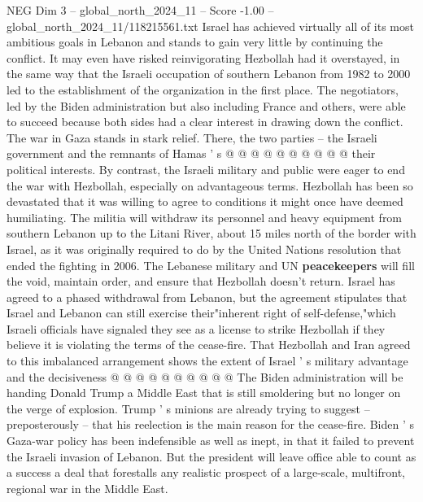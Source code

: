 \begin{textsample}{NEG Dim 3 – global\_north\_2024\_11 – Score -1.00 – global\_north\_2024\_11/118215561.txt}
Israel has achieved virtually all of its most ambitious goals in Lebanon and stands to gain very little by continuing the conflict.
It may even have risked reinvigorating Hezbollah had it overstayed, in the same way that the Israeli occupation of southern Lebanon from 1982 to 2000 led to the establishment of the organization in the first place.
The negotiators, led by the Biden administration but also including France and others, were able to succeed because both sides had a clear interest in drawing down the conflict.
The war in Gaza stands in stark relief.
There, the two parties -- the Israeli government and the remnants of Hamas ' s @ @ @ @ @ @ @ @ @ @ their political interests.
By contrast, the Israeli military and public were eager to end the war with Hezbollah, especially on advantageous terms.
Hezbollah has been so devastated that it was willing to agree to conditions it might once have deemed humiliating.
The militia will withdraw its personnel and heavy equipment from southern Lebanon up to the Litani River, about 15 miles north of the border with Israel, as it was originally required to do by the United Nations resolution that ended the fighting in 2006.
The Lebanese military and UN \textbf{peacekeepers} will fill the void, maintain order, and ensure that Hezbollah doesn't return.
Israel has agreed to a phased withdrawal from Lebanon, but the agreement stipulates that Israel and Lebanon can still exercise their"inherent right of self-defense,"which Israeli officials have signaled they see as a license to strike Hezbollah if they believe it is violating the terms of the cease-fire.
That Hezbollah and Iran agreed to this imbalanced arrangement shows the extent of Israel ' s military advantage and the decisiveness @ @ @ @ @ @ @ @ @ @ The Biden administration will be handing Donald Trump a Middle East that is still smoldering but no longer on the verge of explosion.
Trump ' s minions are already trying to suggest -- preposterously -- that his reelection is the main reason for the cease-fire.
Biden ' s Gaza-war policy has been indefensible as well as inept, in that it failed to prevent the Israeli invasion of Lebanon.
But the president will leave office able to count as a success a deal that forestalls any realistic prospect of a large-scale, multifront, regional war in the Middle East.

\end{textsample}
